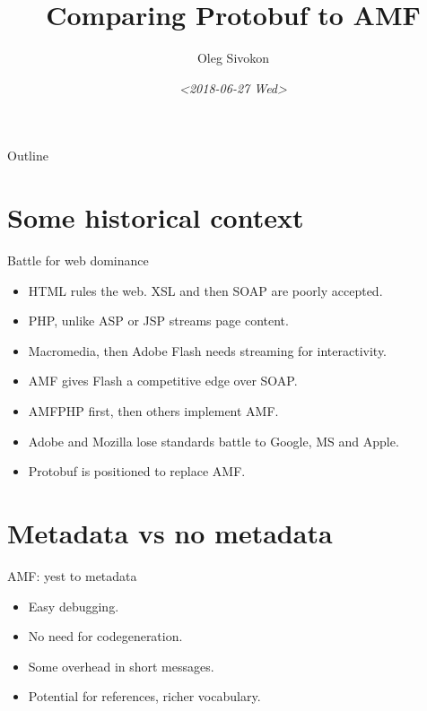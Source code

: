 \documentclass[presentation]{beamer}
\author{Oleg Sivokon}
\date{\textit{<2018-06-27 Wed>}}
\title{Comparing Protobuf to AMF}
\begin{document}
\maketitle
\begin{frame}{Outline}
\tableofcontents
\end{frame}


\section{Some historical context}
\label{sec:org5cc1c25}

\begin{frame}[label={sec:org2b49d55}]{Battle for web dominance}
\begin{itemize}
\item HTML rules the web.  XSL and then SOAP are poorly accepted.
\item PHP, unlike ASP or JSP streams page content.
\item Macromedia, then Adobe Flash needs streaming for interactivity.
\item AMF gives Flash a competitive edge over SOAP.
\item AMFPHP first, then others implement AMF.
\item Adobe and Mozilla lose standards battle to Google, MS and Apple.
\item Protobuf is positioned to replace AMF.
\end{itemize}
\end{frame}

\section{Metadata vs no metadata}
\label{sec:org379fe19}

\begin{frame}[label={sec:orgeb8ea49}]{AMF: yest to metadata}
\begin{itemize}
\item Easy debugging.
\item No need for codegeneration.
\item Some overhead in short messages.
\item Potential for references, richer vocabulary.
\end{itemize}
\end{frame}
\end{document}
